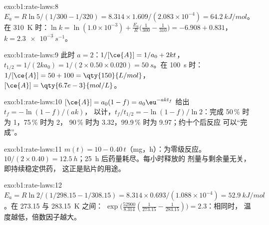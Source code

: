 \begin{solution}{exo:b1:rate-laws:8}
$E_a = R\ln5/(1/300 - 1/320) = 8.314 \times 1.609/(2.083 \times 10^{-4}) =
\qty{64.2}{kJ/mol}$。在 \qty{310}{K} 时：$\ln k = \ln(1.0 \times 10^{-3}) +
\frac{E_a}{R}\big(\frac{1}{300} - \frac{1}{310}\big) = -6.908 + 0.831$，
$k = \qty{2.3e-3}{s^{-1}}$。
\end{solution}

\begin{solution}{exo:b1:rate-laws:9}
此时 $a = 2$：$1/[\ce{A}] = 1/a_0 + 2kt$，$t_{1/2} = 1/(2k a_0) = 1/(2
\times 0.50 \times 0.020) = \qty{50}{s}$。在 \qty{100}{s} 时：$1/[\ce{A}] = 50
+ 100 = \qty{150}{L/mol}$，$[\ce{A}] = \qty{6.7e-3}{mol/L}$。
\end{solution}

\begin{solution}{exo:b1:rate-laws:10}
$[\ce{A}] = a_0(1 - f) = a_0\eu^{-akt_f}$ 给出 $t_f = -\ln(1-f)/(ak)$，
以计，$t_f/t_{1/2} = -\ln(1-f)/\ln2$：完成 50\,\% 时为 1，75\,\% 时为 2，
90\,\% 时为 3.32，99.9\,\% 时为 9.97；约十个后反应
可以“完成”。
\end{solution}

\begin{solution}{exo:b1:rate-laws:11}
$m(t) = 10 - 0.40\,t$（\unit{mg}，\unit{h}）：为零级反应。
$10/(2 \times 0.40) = \qty{12.5}{h}$；\qty{25}{h} 后药量耗尽。每小时释放的
剂量与剩余量无关，即持续稳定供药，
这正是贴片的用途。
\end{solution}

\begin{solution}{exo:b1:rate-laws:12}
$E_a = R\ln2/(1/298.15 - 1/308.15) = 8.314 \times 0.693/(1.088 \times
10^{-4}) = \qty{52.9}{kJ/mol}$。在 273.15 与 \qty{283.15}{K} 之间：
$\exp\big(\frac{52900}{8.314}(\frac{1}{273.15} - \frac{1}{283.15})\big) =
2.3$：相同时，
温度越低，倍数因子越大。
\end{solution}

